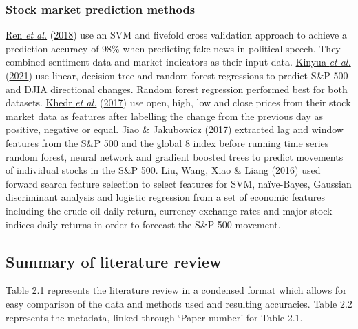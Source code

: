 \documentclass[11pt,preprint, authoryear]{elsarticle}
\numberwithin{equation}{section}
\numberwithin{figure}{section}
\numberwithin{table}{section}
\begin{document}
\hypertarget{stock-market-prediction-methods}{%
\subsubsection{\texorpdfstring{Stock market prediction methods
\label{stockPred}}{Stock market prediction methods }}\label{stock-market-prediction-methods}}

\protect\hyperlink{ref-ren2018forecasting}{Ren \emph{et al.}}
(\protect\hyperlink{ref-ren2018forecasting}{2018}) use an SVM and
fivefold cross validation approach to achieve a prediction accuracy of
98\% when predicting fake news in political speech. They combined
sentiment data and market indicators as their input data.
\protect\hyperlink{ref-kinyua2021analysis}{Kinyua \emph{et al.}}
(\protect\hyperlink{ref-kinyua2021analysis}{2021}) use linear, decision
tree and random forest regressions to predict S\&P 500 and DJIA
directional changes. Random forest regression performed best for both
datasets. \protect\hyperlink{ref-khedr2017predicting}{Khedr \emph{et
al.}} (\protect\hyperlink{ref-khedr2017predicting}{2017}) use open,
high, low and close prices from their stock market data as features
after labelling the change from the previous day as positive, negative
or equal. \protect\hyperlink{ref-jiao2017predicting}{Jiao \& Jakubowicz}
(\protect\hyperlink{ref-jiao2017predicting}{2017}) extracted lag and
window features from the S\&P 500 and the global 8 index before running
time series random forest, neural network and gradient boosted trees to
predict movements of individual stocks in the S\&P 500.
\protect\hyperlink{ref-liu2016forecasting}{Liu, Wang, Xiao \& Liang}
(\protect\hyperlink{ref-liu2016forecasting}{2016}) used forward search
feature selection to select features for SVM, naïve-Bayes, Gaussian
discriminant analysis and logistic regression from a set of economic
features including the crude oil daily return, currency exchange rates
and major stock indices daily returns in order to forecast the S\&P 500
movement.

\hypertarget{summary-of-literature-review}{%
\subsection{\texorpdfstring{Summary of literature review
\label{litSumm}}{Summary of literature review }}\label{summary-of-literature-review}}

Table 2.1 represents the literature review in a condensed format which
allows for easy comparison of the data and methods used and resulting
accuracies. Table 2.2 represents the metadata, linked through `Paper
number' for Table 2.1.
\end{document}
